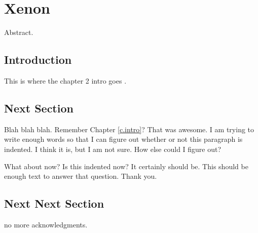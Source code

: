 \chapter{Xenon}
\label{c.xenon}

Abstract.

\section{Introduction}

This is where the chapter 2 intro goes \cite{williams12}.

\section{Next Section}
Blah blah blah. Remember Chapter \ref{c.intro}? That was awesome. I am trying to write enough words so that I can figure out whether or not this paragraph is indented. I think it is, but I am not sure. How else could I figure out?

What about now? Is this indented now? It certainly should be.  This should be enough text to answer that question.  Thank you.
%

\section{Next Next Section}

no more acknowledgments.

